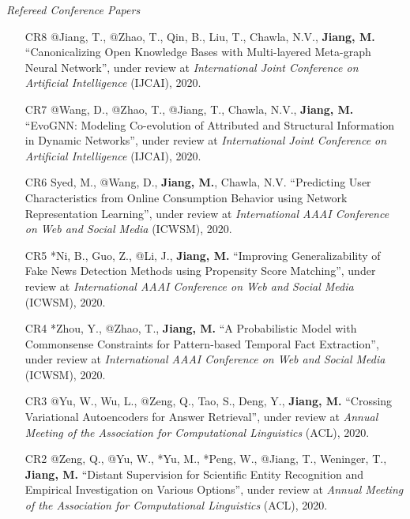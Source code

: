\documentclass[10pt]{article}
\newenvironment{myindentpar}[1]%
{\begin{list}{}%
         {\setlength{\leftmargin}{#1}}%
         \item[]%
}
{\end{list}}
\newcounter{list}
\begin{document}
\begin{myindentpar}{0.00cm}

\vspace{.2cm}\hspace{-0.25cm}\emph{Refereed Conference Papers}

\begin{enumerate}[leftmargin=.5cm]
	
\item[CR8] @Jiang, T., @Zhao, T., Qin, B., Liu, T., Chawla, N.V., \textbf{Jiang, M.} ``Canonicalizing Open Knowledge Bases with Multi-layered Meta-graph Neural Network'', under review at \textit{International Joint Conference on Artificial Intelligence} (IJCAI), 2020.

\item[CR7] @Wang, D., @Zhao, T., @Jiang, T., Chawla, N.V., \textbf{Jiang, M.} ``EvoGNN: Modeling Co-evolution of Attributed and Structural Information in Dynamic Networks'', under review at \textit{International Joint Conference on Artificial Intelligence} (IJCAI), 2020.

\item[CR6] Syed, M., @Wang, D., \textbf{Jiang, M.}, Chawla, N.V. ``Predicting User Characteristics from Online Consumption Behavior using Network Representation Learning'', under review at \textit{International AAAI Conference on Web and Social Media} (ICWSM), 2020.
	
\item[CR5] *Ni, B., Guo, Z., @Li, J., \textbf{Jiang, M.} ``Improving Generalizability of Fake News Detection Methods using Propensity Score Matching'', under review at \textit{International AAAI Conference on Web and Social Media} (ICWSM), 2020.

\item[CR4] *Zhou, Y., @Zhao, T., \textbf{Jiang, M.} ``A Probabilistic Model with Commonsense Constraints for Pattern-based Temporal Fact Extraction'', under review at \textit{International AAAI Conference on Web and Social Media} (ICWSM), 2020.

\item[CR3] @Yu, W., Wu, L., @Zeng, Q., Tao, S., Deng, Y., \textbf{Jiang, M.} ``Crossing Variational Autoencoders for Answer Retrieval'', under review at \textit{Annual Meeting of the Association for Computational Linguistics} (ACL), 2020.

\item[CR2] @Zeng, Q., @Yu, W., *Yu, M., *Peng, W., @Jiang, T., Weninger, T., \textbf{Jiang, M.} ``Distant Supervision for Scientific Entity Recognition and Empirical Investigation on Various Options'', under review at \textit{Annual Meeting of the Association for Computational Linguistics} (ACL), 2020.


\end{enumerate}
\end{myindentpar}
\end{document}
